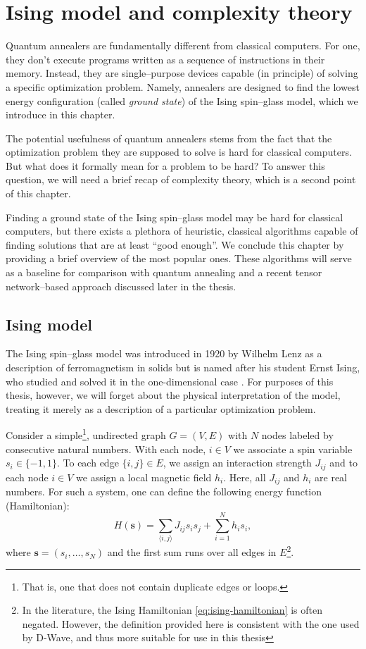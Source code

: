 \chapter{Ising model and complexity theory}


Quantum annealers are fundamentally different from classical computers. For one, they don't
execute programs written as a sequence of instructions in their memory. Instead, they are
single--purpose devices capable (in principle) of solving a specific optimization problem.
Namely, annealers are designed to find the lowest energy configuration (called \emph{ground state})
of the Ising spin--glass model, which we introduce in this chapter.

The potential usefulness of quantum annealers stems from the fact that the optimization problem they
are supposed to solve is hard for classical computers. But what does it formally mean for a problem
to be hard? To answer this question, we will need a brief recap of complexity theory, which is a
second point of this chapter.

Finding a ground state of the Ising spin--glass model may be hard for classical computers, but
there exists a plethora of heuristic, classical algorithms capable of finding solutions that are at
least ``good enough''. We conclude this chapter by providing a brief overview of the most popular ones.
These algorithms will serve as a baseline for comparison with quantum annealing and a recent
tensor network--based approach discussed later in the thesis.

\section{Ising model}

The Ising spin--glass model was introduced in 1920 by Wilhelm Lenz \cite{lenz} as a description of
ferromagnetism in solids but is named after his student Ernst Ising, who studied and solved it in
the one-dimensional case \cite{ising}. For purposes of this thesis, however, we will forget about
the physical interpretation of the model, treating it merely as a description of a particular
optimization problem.

Consider a simple\footnote{That is, one that does not contain duplicate edges or loops.}, undirected
graph $G = (V, E)$ with $N$ nodes labeled by consecutive natural numbers.  With each node, $i \in V$
we associate a spin variable $s_i \in \{-1, 1\}$. To each edge $\{i, j\} \in E$, we
assign an interaction strength $J_{ij}$ and to each node $i \in V$ we assign a local magnetic field
$h_i$. Here, all $J_{ij}$ and $h_i$ are real numbers. For such a system, one can define the
following energy function (Hamiltonian):
\begin{equation}
\label{eq:ising-hamiltonian}
H(\mathbf{s}) = \sum_{\langle i, j \rangle} J_{ij} s_i s_j +  \sum_{i=1}^N h_i s_i,
\end{equation}
where $\mathbf{s} = (s_i, \ldots, s_N)$ and the first sum runs over all edges in $E$\footnote{In the
literature, the Ising Hamiltonian \eqref{eq:ising-hamiltonian} is often negated. However, the
definition provided here is consistent with the one used by D-Wave, and thus more suitable for use
in this thesis}.

